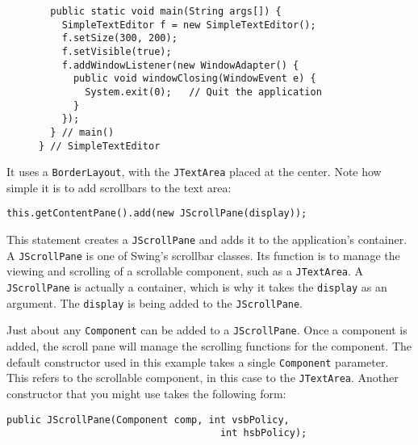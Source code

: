 \begin{figure}[h!]
\begin{jjjlisting}[37pc]
\begin{lstlisting}
  public static void main(String args[]) {
    SimpleTextEditor f = new SimpleTextEditor();
    f.setSize(300, 200);
    f.setVisible(true);
    f.addWindowListener(new WindowAdapter() {     
      public void windowClosing(WindowEvent e) {
        System.exit(0);   // Quit the application
      }
    });
  } // main()
} // SimpleTextEditor
\end{lstlisting}
\end{jjjlisting}
\end{figure}

\clearpage
\noindent It uses a {\tt BorderLayout}, with the {\tt JTextArea}
placed at the center.  Note how simple it is to add
scrollbars to the text area:

\begin{jjjlisting}
\begin{lstlisting}
this.getContentPane().add(new JScrollPane(display));
\end{lstlisting}
\end{jjjlisting}

\noindent This statement creates a {\tt JScrollPane} and
adds it to the application's container.  A {\tt JScrollPane} is one of
Swing's scrollbar classes. Its function is to manage the viewing and
scrolling of a scrollable component, such as a {\tt JTextArea}.  A
{\tt JScrollPane} is actually a container, which is why it takes the
{\tt display} as an argument. The {\tt display} is being added to the
{\tt JScrollPane}.

Just about any {\tt Component} can be added to a {\tt JScrollPane}.
Once a component is added, the scroll pane will manage the
scrolling functions for the component. The default constructor used in
this example takes a single {\tt Component} parameter. This refers to
the scrollable component, in this case to the {\tt JTextArea}.
Another constructor that you might use takes the following form:

\begin{jjjlisting}
\begin{lstlisting}
public JScrollPane(Component comp, int vsbPolicy, 
                                     int hsbPolicy);
\end{lstlisting}
\end{jjjlisting}

